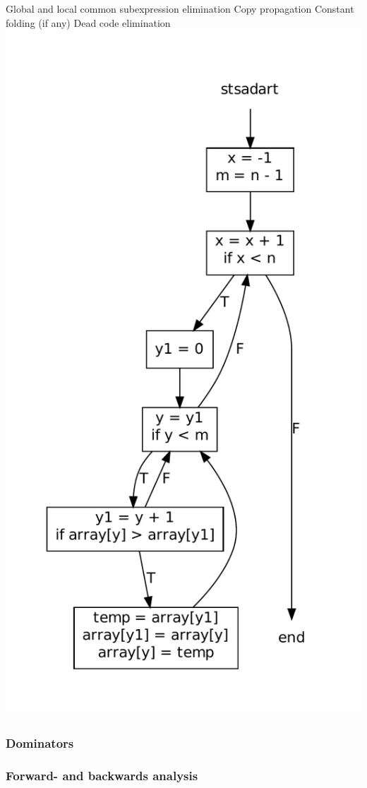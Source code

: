 \documentclass[english,a4paper]{scrartcl}
\begin{document}
\subsubsection{}
 Global and local common subexpression elimination
 Copy propagation
 Constant folding (if any)
 Dead code elimination
\includegraphics{flowgraph_optimized.pdf}
\subsection{}
\subsubsection{Dominators}

\subsubsection{Forward- and backwards analysis}
\end{document}
